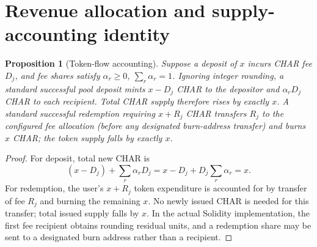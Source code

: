\documentclass[11pt]{article}
\newtheorem{proposition}{Proposition}
\begin{document}
\section{Revenue allocation and supply-accounting identity}
\begin{proposition}[Token-flow accounting]
Suppose a deposit of $x$ incurs CHAR fee $D_j$, and fee shares satisfy $\alpha_r\ge0$, $\sum_r\alpha_r=1$. Ignoring integer rounding, a standard successful pool deposit mints $x-D_j$ CHAR to the depositor and $\alpha_rD_j$ CHAR to each recipient. Total CHAR supply therefore rises by exactly $x$. A standard successful redemption requiring $x+R_j$ CHAR transfers $R_j$ to the configured fee allocation (before any designated burn-address transfer) and burns $x$ CHAR; the token supply falls by exactly $x$.
\end{proposition}
\begin{proof}
For deposit, total new CHAR is
\[
(x-D_j)+\sum_r\alpha_rD_j=x-D_j+D_j\sum_r\alpha_r=x.
\]
For redemption, the user's $x+R_j$ token expenditure is accounted for by transfer of fee $R_j$ and burning the remaining $x$. No newly issued CHAR is needed for this transfer; total issued supply falls by $x$. In the actual Solidity implementation, the first fee recipient obtains rounding residual units, and a redemption share may be sent to a designated burn address rather than a recipient.
\end{proof}
\end{document}
